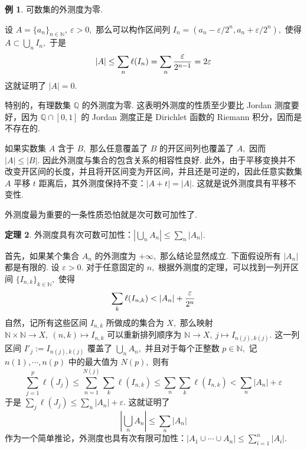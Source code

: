 \documentclass[12pt, a4paper, oneside]{book}
\numberwithin{figure}{section}
\theoremstyle{definition}
\newtheorem{theorem}{定理}[section]
\newtheorem{example}[theorem]{例}
\begin{document}
\begin{example}
    可数集的外测度为零.
\end{example}
设 $A=\{a_n\}_{n\in\mathbb N},\ \varepsilon>0,$ 那么可以构作区间列 $I_n=(a_n-\varepsilon/2^n,a_n+\varepsilon/2^n),$ 使得 $A\subset \bigcup_n I_n,$ 于是 
\begin{equation}
    |A|\leq \sum_n \ell(I_n)=\sum_n {\varepsilon\over 2^{n-1}}=2\varepsilon
\end{equation}
这就证明了 $|A|=0.$ 

特别的，有理数集 $\mathbb Q$ 的外测度为零. 这表明外测度的性质至少要比 Jordan 测度要好，因为 $\mathbb Q\cap [0,1]$ 的 Jordan 测度正是 Dirichlet 函数的 Riemann 积分，因而是不存在的.

如果实数集 $A$ 含于 $B,$ 那么任意覆盖了 $B$ 的开区间列也覆盖了 $A,$ 因而 $|A|\leq |B|.$ 因此外测度与集合的包含关系的相容性良好. 此外，由于平移变换并不改变开区间的长度，并且将开区间变为开区间，并且还是可逆的，因此任意实数集 $A$ 平移 $t$ 距离后，其外测度保持不变：$|A+t|=|A|.$ 这就是说外测度具有平移不变性.

外测度最为重要的一条性质恐怕就是次可数可加性了.
\begin{theorem}
    外测度具有次可数可加性：$|\bigcup_n A_n|\leq \sum_n |A_n|.$
\end{theorem}
首先，如果某个集合 $A_n$ 的外测度为 $+\infty,$ 那么结论显然成立. 下面假设所有 $|A_n|$ 都是有限的. 设 $\varepsilon>0.$ 对于任意固定的 $n,$ 根据外测度的定理，可以找到一列开区间 $\{I_{n,k}\}_{k\in\mathbb N},$ 使得
\begin{equation}
    \sum_k \ell(I_{n,k})<|A_n|+{\varepsilon\over 2^n}
\end{equation}
自然，记所有这些区间 $I_{n,k}$ 所做成的集合为 $X,$ 那么映射 $\mathbb N\times\mathbb N\to X,\ (n,k)\mapsto I_{n,k}$ 可以重新排列顺序为 $\mathbb N\to X,\ j\mapsto I_{n(j),k(j)}.$ 这一列区间 $I'_j:=I_{n(j),k(j)}$ 覆盖了 $\bigcup_n A_n,$ 并且对于每个正整数 $p\in\mathbb N,$ 记 $n(1),\cdots,n(p)$ 中的最大值为 $N(p),$ 则有
\begin{equation}
    \sum_{j=1}^p \ell(J_j) \leq \sum_{n=1}^{N(j)} \sum_k \ell(I_{n,k}) \leq \sum_n\sum_k \ell(I_{n,k})<\sum_n |A_n|+\varepsilon
\end{equation}
于是 $\sum_j \ell(J_j)\leq\sum_n |A_n|+\varepsilon.$ 
这就证明了 
\begin{equation}\label{eq:outer_measure_subadditivity}
    \left|\bigcup_n A_n\right|\leq \sum_n |A_n|
\end{equation}
作为一个简单推论，外测度也具有次有限可加性：$|A_1\cup\cdots\cup A_n|\leq \sum_{i=1}^n |A_i|.$ 
\end{document}
